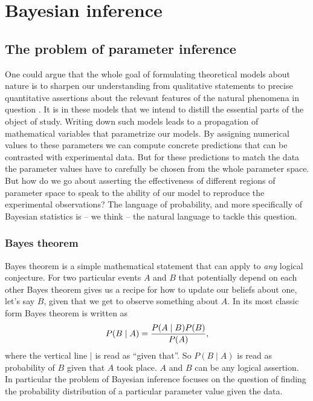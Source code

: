 \section{Bayesian inference}
\label{sec:bayesian}

\subsection{The problem of parameter inference}


One could argue that the whole goal of formulating theoretical models about
nature is to sharpen our understanding from qualitative statements to precise
quantitative assertions about the relevant features of the natural phenomena in
question \cite{Gunawardena2014}. It is in these models that we intend to distill
the essential parts of the object of study. Writing down such models leads to a
propagation of mathematical variables that parametrize our models. By assigning
numerical values to these parameters we can compute concrete predictions that
can be contrasted with experimental data. But for these predictions to match the
data the parameter values have to carefully be chosen from the whole parameter
space. But how do we go about asserting the effectiveness of different regions
of parameter space to speak to the ability of our model to reproduce the
experimental observations? The language of probability, and more specifically of
Bayesian statistics is -- we think -- the natural language to tackle this
question.

\subsubsection{Bayes theorem}

Bayes theorem is a simple mathematical statement that can apply to \textit{any}
logical conjecture. For two particular events $A$ and $B$ that potentially 
depend on each other Bayes theorem gives us a recipe for how to update our 
beliefs about one, let's say $B$, given that we get to observe something about
$A$. In its most classic form Bayes theorem is written as
\begin{equation}
P(B \mid A) = {P(A \mid B) P(B) \over P(A)},
\end{equation}
where the vertical line $\mid$ is read as ``given that''. So $P(B \mid A)$ is
read as probability of $B$ given that $A$ took place. $A$ and $B$ can be any
logical assertion. In particular the problem of Bayesian inference focuses on
the question of finding the probability distribution of a particular parameter
value given the data.

